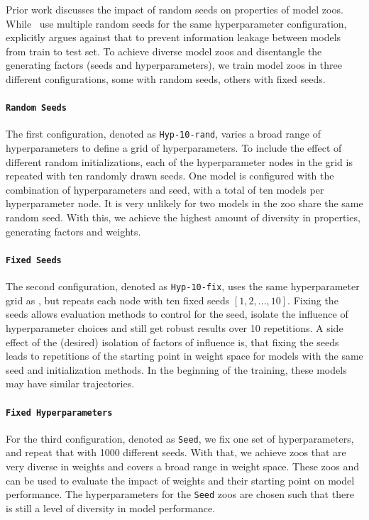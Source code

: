 %
%
Prior work discusses the impact of random seeds on properties of model zoos. While~\citep{yakTaskArchitectureIndependentGeneralization2019} 
use multiple random seeds for the same hyperparameter configuration, ~\citep{unterthinerPredictingNeuralNetwork2020} 
explicitly argues against that to prevent information leakage between models from train to test set. 
% 
To achieve diverse model zoos and disentangle the generating factors (seeds and hyperparameters), we train model zoos in three different configurations, some with random seeds, others with fixed seeds.

\vspace{-2pt}
\paragraph{\texttt{Random Seeds}} The first configuration, denoted as \texttt{Hyp-10-rand}, varies a broad range of hyperparameters to define a grid of hyperparameters. 
To include the effect of different random initializations, each of the hyperparameter nodes in the grid is repeated with ten randomly drawn seeds. 
One model is configured with the combination of hyperparameters and seed, with a total of ten models per hyperparameter node. 
It is very unlikely for two models in the zoo share the same random seed.
With this, we achieve the highest amount of diversity in properties, generating factors and weights. 

\vspace{-2pt}
\paragraph{\texttt{Fixed Seeds}}
The second configuration, denoted as \texttt{Hyp-10-fix}, uses the same hyperparameter grid as , but repeats each node with ten fixed seeds $[1,2,...,10]$. Fixing the seeds allows evaluation methods to control for the seed, isolate the influence of hyperparameter choices and still get robust results over 10 repetitions. A side effect of the (desired) isolation of factors of influence is, that fixing the seeds leads to repetitions of the starting point in weight space for models with the same seed and initialization methods. In the beginning of the training, these models may have similar trajectories.

\vspace{-2pt}
\paragraph{\texttt{Fixed Hyperparameters}}
For the third configuration, denoted as \texttt{Seed}, we fix one set of hyperparameters, and repeat that with 1000 different seeds. With that, we achieve zoos that are very diverse in weights and covers a broad range in weight space. These zoos and can be used to evaluate the impact of weights and their starting point on model performance. The hyperparameters for the \texttt{Seed} zoos are chosen such that there is still a level of diversity in model performance.




